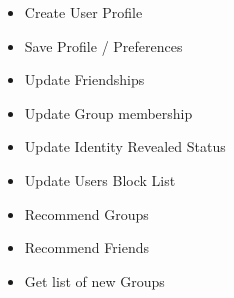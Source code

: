 \documentclass[12pt,a4paper]{article}
\begin{document}
\begin{itemize}

    \item Create User Profile
    \item Save Profile / Preferences
    \item Update Friendships
    \item Update Group membership
    \item Update Identity Revealed Status
    \item Update Users Block List

    \item Recommend Groups
    \item Recommend Friends
    \item Get list of new Groups
\end{itemize}
\end{document}
